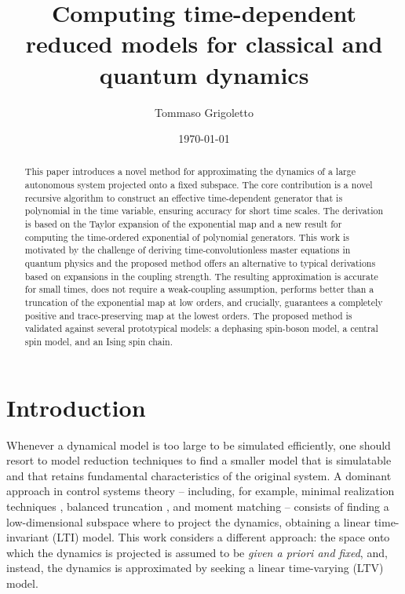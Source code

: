 \documentclass[10pt,aps,pra,twocolumn,showpacs,superscriptaddress,nobalancelastpage,notitlepage,nofootinbib,longbibliography]{revtex4-2}
\begin{document}
\title{Computing time-dependent reduced models for classical and quantum dynamics}

\author{Tommaso Grigoletto}

\date{\today}

\begin{abstract}
    This paper introduces a novel method for approximating the dynamics of a large autonomous system projected onto a fixed subspace. The core contribution is a novel recursive algorithm to construct an effective time-dependent generator that is polynomial in the time variable, ensuring accuracy for short time scales. The derivation is based on the Taylor expansion of the exponential map and a new result for computing the time-ordered exponential of polynomial generators.
    This work is motivated by the challenge of deriving time-convolutionless master equations in quantum physics and the proposed method offers an alternative to typical derivations based on expansions in the coupling strength. 
    The resulting approximation is accurate for small times, does not require a weak-coupling assumption, performs better than a truncation of the exponential map at low orders, and crucially, guarantees a completely positive and trace-preserving map at the lowest orders. The proposed method is validated against several prototypical models: a dephasing spin-boson model, a central spin model, and an Ising spin chain.
\end{abstract}

\maketitle

\section{Introduction}
Whenever a dynamical model is too large to be simulated efficiently, one should resort to model reduction techniques to find a smaller model that is simulatable and that retains fundamental characteristics of the original system. A dominant approach in control systems theory -- including, for example, minimal realization techniques \cite{rosenbrock1970state}, balanced truncation \cite{antoulas,gugercin2004survey}, and moment matching \cite{astolfi_moment_matching,padoanmomentmatching} -- consists of finding a low-dimensional subspace where to project the dynamics, obtaining a linear time-invariant (LTI) model. This work considers a different approach: the space onto which the dynamics is projected is assumed to be {\em given a priori and fixed}, and, instead, the dynamics is approximated by seeking a linear time-varying (LTV) model. 
\end{document}
